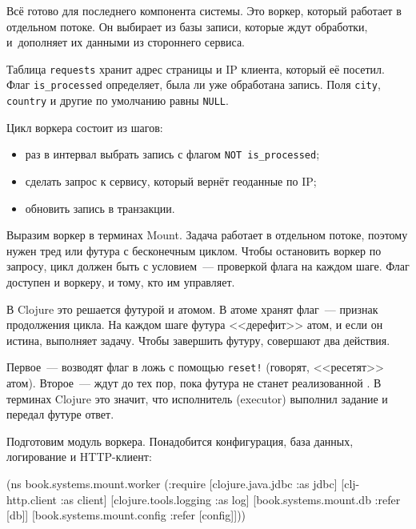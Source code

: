 \label{worker}

Всё готово для последнего компонента системы. Это воркер, который работает в
отдельном потоке. Он выбирает из базы записи, которые ждут обработки,
и~дополняет их данными из стороннего сервиса.

Таблица \verb|requests| хранит адрес страницы и IP клиента, который её
посетил. Флаг \verb|is_processed| определяет, была ли уже обработана
запись. Поля \verb|city|, \verb|country| и другие по умолчанию равны
\verb|NULL|.


Цикл воркера состоит из шагов:

\begin{itemize}

\item
  раз в интервал выбрать запись с флагом \verb|NOT is_processed|;

\item
  сделать запрос к сервису, который вернёт геоданные по IP;

\item
  обновить запись в транзакции.

\end{itemize}

Выразим воркер в терминах Mount. Задача работает в отдельном потоке, поэтому
нужен тред или футура с бесконечным циклом. Чтобы остановить воркер по запросу,
цикл должен быть с условием~--- проверкой флага на каждом шаге. Флаг доступен и
воркеру, и тому, кто им управляет.


В Clojure это решается футурой и атомом. В атоме хранят флаг~--- признак
продолжения цикла. На каждом шаге футура <<дерефит>> атом, и если он истина,
выполняет задачу. Чтобы завершить футуру, совершают два действия.

Первое~--- возводят флаг в ложь с помощью \verb|reset!| (говорят, <<ресетят>>
атом). Второе~--- ждут до тех пор, пока футура не станет реализованной
. В терминах Clojure это значит, что исполнитель (executor)
выполнил задание и передал футуре ответ.

Подготовим модуль воркера. Понадобится конфигурация, база данных, логирование и
HTTP-клиент:

\ifnarrow

\begin{english}
  \begin{clojure}
(ns book.systems.mount.worker
  (:require
   [clojure.java.jdbc :as jdbc]
   [clj-http.client :as client]
   [clojure.tools.logging :as log]
   [book.systems.mount.db :refer [db]]
   [book.systems.mount.config
    :refer [config]]))
  \end{clojure}
\end{english}

